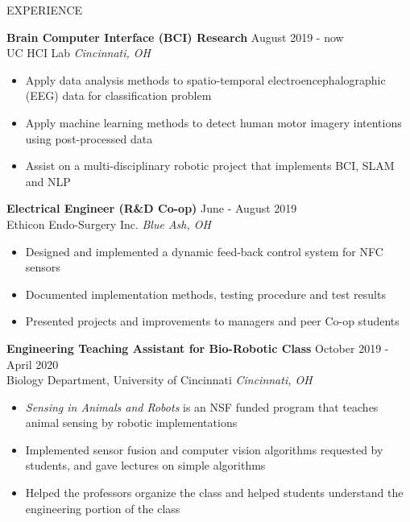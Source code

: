 \documentclass{../lib/resume} %
\begin{document}
\begin{rSection}{EXPERIENCE}

    \textbf{Brain Computer Interface (BCI) Research} \hfill August 2019 - now \\
    UC HCI Lab \hfill \textit{Cincinnati, OH}
    \begin{itemize}
        \itemsep -4pt {}
        \item Apply data analysis methods to spatio-temporal electroencephalographic (EEG) data for classification problem
        \item Apply machine learning methods to detect human motor imagery intentions using post-processed data
        \item Assist on a multi-disciplinary robotic project that implements BCI, SLAM and NLP
    \end{itemize}


    \textbf{Electrical Engineer (R\&D Co-op)} \hfill June - August 2019\\
    Ethicon Endo-Surgery Inc. \hfill \textit{Blue Ash, OH}
    \begin{itemize}
        \itemsep -4pt {}
        \item Designed and implemented a dynamic feed-back control system for NFC sensors
        \item Documented implementation methods, testing procedure and test results
        \item Presented projects and improvements to managers and peer Co-op students
    \end{itemize}


    \textbf{Engineering Teaching Assistant for Bio-Robotic Class} \hfill October 2019 - April 2020\\
    Biology Department, University of Cincinnati \hfill \textit{Cincinnati, OH}
    \begin{itemize}
        \itemsep -4pt {}
        \item \textit{Sensing in Animals and Robots} is an NSF funded program that teaches animal sensing by robotic implementations
        \item Implemented sensor fusion and computer vision algorithms requested by students, and gave lectures on simple algorithms
        \item Helped the professors organize the class and helped students understand the engineering portion of the class
    \end{itemize}



\end{rSection}
\end{document}
